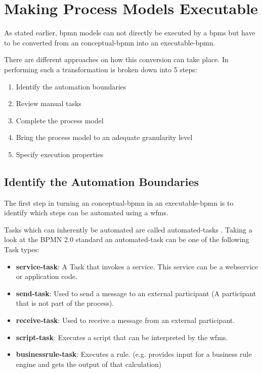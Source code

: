 \section{Making Process Models Executable}
As stated earlier, \gls{bpmn} models can not directly be executed by a \gls{bpms} but have to be converted from an \gls{conceptual-bpmn} into an \gls{executable-bpmn}. 

There are different approaches on how this conversion can take place. In \cite{fundamentals} performing such a transformation is broken down into 5 steps:
\begin{enumerate}
	\item Identify the automation boundaries
	\item Review manual tasks
	\item Complete the process model
	\item Bring the process model to an adequate granularity level
	\item Specify execution properties
\end{enumerate}

\subsection{Identify the Automation Boundaries}\label{automation}
The first step in turning an \gls{conceptual-bpmn} in an  \gls{executable-bpmn} is to identify which steps can be automated using a \gls{wfms}. 

Tasks which can inherently be automated are called \gls{automated-task}s \cite[p.~317]{fundamentals}. Taking a look at the BPMN 2.0 standard an \gls{automated-task} can be one of the following Task types:
\begin{itemize}
	\item \textbf{\gls{service-task}}: A Task that invokes a service. This service can be a webservice or application code.
	\item \textbf{\gls{send-task}}: Used to send a message to an external participant (A participant that is not part of the process).
	\item \textbf{\gls{receive-task}}: Used to receive a message from an external participant. 
	\item \textbf{\gls{script-task}}: Executes a script that can be interpreted by the \gls{wfms}.
	\item \textbf{\gls{businessrule-task}}: Executes a rule. (e.g. provides input for a business rule engine and gets the output of that calculation)
\end{itemize}


